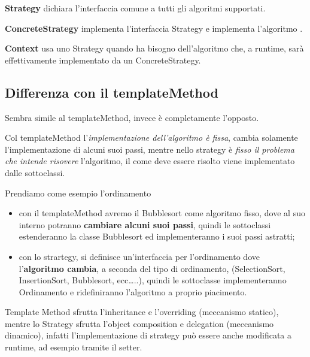 \textbf{Strategy} dichiara l’interfaccia comune a tutti gli algoritmi supportati.

\textbf{ConcreteStrategy} implementa l’interfaccia Strategy e implementa l’algoritmo .

\textbf{Context} usa uno Strategy quando ha bisogno dell’algoritmo che, a runtime, sarà effettivamente implementato da un ConcreteStrategy.

\subsection{Differenza con il templateMethod}

Sembra simile al templateMethod, invece è completamente l'opposto.

Col templateMethod l'\textit{implementazione dell'algoritmo è fissa}, cambia solamente l'implementazione di alcuni suoi passi, mentre nello strategy è 
\textit{fisso il problema che intende risovere} l'algoritmo, il come deve essere risolto viene implementato dalle sottoclassi. 

Prendiamo come esempio l'ordinamento

\begin{itemize}
    \item con il templateMethod avremo il Bubblesort come algoritmo fisso, dove al suo interno potranno \textbf{cambiare alcuni suoi passi}, quindi le sottoclassi
    estenderanno la classe Bubblesort ed implementeranno i suoi passi astratti;
    \item con lo strartegy, si definisce un'interfaccia per l'ordinamento dove l'\textbf{algoritmo cambia}, a seconda del tipo di ordinamento,  
    (SelectionSort, InsertionSort, Bubblesort, ecc\dots..), quindi le sottoclasse implementeranno Ordinamento e ridefiniranno l'algoritmo a proprio piacimento.
\end{itemize}

Template Method sfrutta l’inheritance e l’overriding (meccanismo statico), mentre lo Strategy sfrutta l’object composition e delegation (meccanismo dinamico), 
infatti l’implementazione di strategy può essere anche modificata a runtime, ad esempio tramite il setter.
